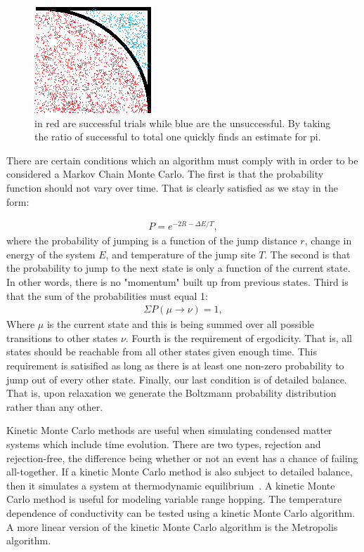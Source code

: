 \begin{figure}[htbp]
\begin{center}
\includegraphics[scale=.50]{piEstimate.png}
\caption{in red are successful trials while blue are the unsuccessful. By taking the ratio of successful to total one quickly finds an estimate for pi.}
\label{piSquare}
\end{center}
\end{figure}


There are certain conditions which an algorithm must comply with in order to be considered a Markov Chain Monte Carlo. The first is that the probability function should not vary over time. That is clearly satisfied as we stay in the form:

\begin{eqnarray}
P = e^{-2R - \Delta E/T},
\label{simpleProb}
\end{eqnarray}
where the probability of jumping is a function of the jump distance $r$, change in energy of the system $E$, and temperature of the jump site $T$. The second is that the probability to jump to the next state is only a function of the current state. In other words, there is no "momentum" built up from previous states. Third is that the sum of the probabilities must equal 1:
\begin{eqnarray}
\Sigma P(\mu \rightarrow \nu) = 1 ,
\label{normalized}
\end{eqnarray}
Where $\mu$ is the current state and this is being summed over all possible transitions to other states $\nu$. Fourth is the requirement of ergodicity. That is, all states should be reachable from all other states given enough time. This requirement is satisified as long as there is at least one non-zero probability to jump out of every other state. Finally, our last condition is of detailed balance. That is, upon relaxation we generate the Boltzmann probability distribution rather than any other.

Kinetic Monte Carlo methods are useful when simulating condensed matter systems which include time evolution. There are two types, rejection and rejection-free, the difference being whether or not an event has a chance of failing all-together. If a kinetic Monte Carlo method is also subject to detailed balance, then it simulates a system at thermodynamic equilibrium~\cite{Young66}. A kinetic Monte Carlo method is useful for modeling variable range hopping. The temperature dependence of conductivity can be tested using a kinetic Monte Carlo algorithm. A more linear version of the kinetic Monte Carlo algorithm is the Metropolis algorithm.

